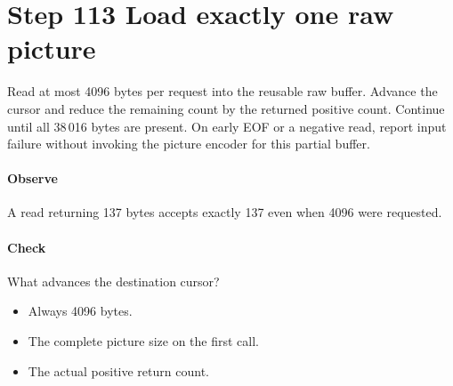 \section{Step 113 Load exactly one raw picture}\label{h263-clip-s03}
Read at most 4096 bytes per request into the reusable raw buffer. Advance the
cursor and reduce the remaining count by the returned positive count. Continue
until all 38\,016 bytes are present. On early EOF or a negative read, report input
failure without invoking the picture encoder for this partial buffer.

\paragraph{Observe} A read returning 137 bytes accepts exactly 137 even when 4096 were requested.
\paragraph{Check} What advances the destination cursor?
\begin{itemize}
  \item[A.] Always 4096 bytes.
  \item[B.] The complete picture size on the first call.
  \item[C.] The actual positive return count.
\end{itemize}
